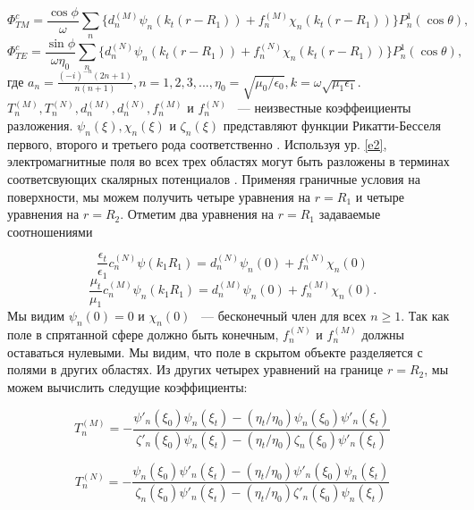 \documentclass[a4paper, 12pt]{article}
\begin{document}
\vspace{1cm}

\begin{equation*}
	\Phi_{TM}^c = \frac{\cos\phi}{\omega}\sum_n{\{d_n^{(M)}\psi_n(k_t(r-R_1)) +
	f_n^{(M)}\chi_n(k_t(r-R_1))\}P_n^1(\cos\theta)},
\end{equation*}
\begin{equation}\label{e9}
	\Phi_{TE}^c = \frac{\sin\phi}{\omega\eta_0}\sum_n{\{d_n^{(N)}\psi_n(k_t(r-R_1)) +
	f_n^{(N)}\chi_n(k_t(r-R_1))\}P_n^1(\cos\theta)},
\end{equation}
где $a_n=\frac{(-i)^{-n}(2n+1)}{n(n+1)}, n=1,2,3,..., 
\eta_0=\sqrt{\mu_0/\epsilon_0},k=\omega\sqrt{\mu_1\epsilon_1}$. 
$T_n^{(M)}, T_n^{(N)}, d_n^{(M)}, d_n^{(N)}, f_n^{(M)}$ и $f_n^{(N)}$ ~--- 
неизвестные коэффеициенты разложения. 
$\psi_n(\xi), \chi_n(\xi)$ и $\zeta_n(\xi)$ представляют функции Рикатти-Бесселя
первого, второго и третьего рода соответственно \cite{15}. 
Используя ур. \eqref{e2}, электромагнитные поля во всех трех областях могут быть
разложены в терминах соответсвующих скалярных потенциалов \cite{16}. 
Применяя граничные условия на поверхности, мы можем получить четыре уравнения
на $r=R_1$ и четыре уравнения на $r=R_2$. Отметим два уравнения на $r=R_1$ 
задаваемые соотношениями

\begin{equation}\label{e10}
	\frac{\epsilon_t}{\epsilon_1}c_n^{(N)}\psi(k_1R_1) = d_n^{(N)}\psi_n(0) +
	f_n^{(N)}\chi_n(0)
\end{equation}
\begin{equation}\label{e11}
\frac{\mu_t}{\mu_1}c_n^{(M)}\psi_n(k_1R_1)=d_n^{(M)}\psi_n(0)+f_n^{(M)}\chi_n(0).
\end{equation}
Мы видим $\psi_n(0)=0$ и $\chi_n(0)$ ~--- бесконечный член для всех $n\ge1$.
Так как поле в спрятанной сфере должно быть конечным, $f_n^{(N)}$ и $f_n^{(M)}$
должны оставаться нулевыми. Мы видим, что поле в скрытом объекте разделяется
с полями в других областях. Из других четырех уравнений на границе $r=R_2$,
мы можем вычислить следущие коэффициенты:

\begin{equation}\label{e12}
	T_n^{(M)} = - 
	\frac{\psi'_n(\xi_0)\psi_n(\xi_t)-(\eta_t/\eta_0)\psi_n(\xi_0)\psi'_n(\xi_t)}{\zeta'_n(\xi_0)\psi_n(\xi_t)-(\eta_t/\eta_0)\zeta_n(\xi_0)\psi'_n(\xi_t)}
\end{equation}

\begin{equation}\label{e13}
	T_n^{(N)} = - 
	\frac{\psi_n(\xi_0)\psi'_n(\xi_t)-(\eta_t/\eta_0)\psi'_n(\xi_0)\psi_n(\xi_t)}{\zeta_n(\xi_0)\psi'_n(\xi_t)-(\eta_t/\eta_0)\zeta'_n(\xi_0)\psi_n(\xi_t)}
\end{equation}
\end{document}
